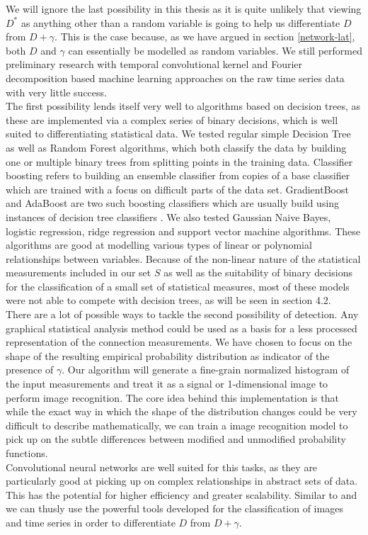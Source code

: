 \documentclass[12pt,a4paper,automark, toc=bib]{scrreprt}
\theoremstyle{definition}
\begin{document}
			We will ignore the last possibility in this thesis as it is quite unlikely that viewing $D^*$ as anything other than a random variable is going to help us differentiate $D$ from $D + \gamma$. This is the case because, as we have argued in section \ref{network-lat}, both $D$ and $\gamma$ can essentially be modelled as random variables. We still performed preliminary research with temporal convolutional kernel and Fourier decomposition based machine learning approaches on the raw time series data with very little success.\\
			The first possibility lends itself very well to algorithms based on decision trees, as these are implemented via a complex series of binary decisions, which is well suited to differentiating statistical data. We tested regular simple Decision Tree as well as Random Forest algorithms, which both classify the data by building one or multiple binary trees from splitting points in the training data. Classifier boosting refers to building an ensemble classifier from copies of a base classifier which are trained with a focus on difficult parts of the data set. GradientBoost and AdaBoost are two such boosting classifiers which are usually build using instances of decision tree classifiers \cite{Pedregosa2011}. 
			We also tested Gaussian Naive Bayes, logistic regression, ridge regression and support vector machine algorithms. These algorithms are good at modelling various types of linear or polynomial relationships between variables. Because of the non-linear nature of the statistical measurements included in our set $S$ as well as the suitability of binary decisions for the classification of a small set of statistical measures, most of these models were not able to compete with decision trees, as will be seen in section 4.2. \\
			There are a lot of possible ways to tackle the second possibility of detection. Any graphical statistical analysis method could be used as a basis for a less processed representation of the connection measurements. We have chosen to focus on the shape of the resulting empirical probability distribution as indicator of the presence of $\gamma$. Our algorithm will generate a fine-grain normalized histogram of the input measurements and treat it as a signal or 1-dimensional image to perform image recognition. The core idea behind this implementation is that while the exact way in which the shape of the distribution changes could be very difficult to describe mathematically, we can train a image recognition model to pick up on the subtle differences between modified and unmodified probability functions.\\
			Convolutional neural networks are well suited for this tasks, as they are particularly good at picking up on complex relationships in abstract sets of data.  This has the potential for higher efficiency and greater scalability. Similar to  \cite{Al-Eidi2021} and \cite{Yuan2020a} we can thusly use the powerful tools developed for the classification of images and time series in order to differentiate $D$ from $D+\gamma$.
\end{document}
